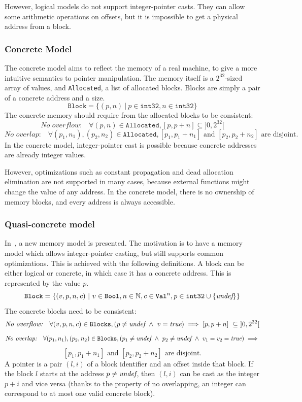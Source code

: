 However, logical models do not support integer-pointer casts. They can allow some arithmetic operations on offsets, but it is impossible to get a physical address from a block.

\subsubsection{Concrete Model}
The concrete model aims to reflect the memory of a real machine, to give a more intuitive semantics to pointer manipulation. 
The memory itself is a $2^{32}$-sized array of values, and \texttt{Allocated}, a list of allocated blocks.
Blocks are simply a pair of a concrete address and a size.
$$\texttt{Block}=\{(p,n)~|~p\in\texttt{int32},n\in\texttt{int32}\}$$
The concrete memory should require from the allocated blocks to be consistent:
$$\textit{No overflow:}\quad\forall (p,n)\in\texttt{Allocated}, [p,p+n]\subseteq]0,2^{32}[$$
$$\textit{No overlap:}\quad\forall (p_1,n_1), (p_2,n_2)\in\texttt{Allocated}, [p_1,p_1+n_1]\text{ and }[p_2,p_2+n_2]\text{ are disjoint.}$$
In the concrete model, integer-pointer cast is possible because concrete addresses are already integer values.

However, optimizations such as constant propagation and dead allocation elimination are not supported in many cases, because external functions might change the value of any address. In the concrete model, there is no ownership of memory blocks, and every address is always accessible.
\subsubsection{Quasi-concrete model}
In~\cite{DBLP:conf/pldi/KangHMGZV15}, a new memory model is presented. The motivation is to have a memory model which allows integer-pointer casting, but still supports common optimizations.
This is achieved with the following definitions.
A block can be either logical or concrete, in which case it has a concrete address. This is represented by the value $p$.
$$\texttt{Block}=\{(v,p,n,c)~|~v\in\texttt{Bool},n\in\mathbb{N},c\in\texttt{Val}^{n},p\in\texttt{int32}\cup\{\textit{undef}\}\}$$
The concrete blocks need to be consistent:
$$\textit{No overflow:}\quad\forall (v,p,n,c)\in\texttt{Blocks}, (p\neq\textit{undef}~\wedge~ v=\textit{true})\implies[p,p+n]~\subseteq~]0,2^{32}[$$
$$\textit{No overlap:}\quad\forall (p_1,n_1), (p_2,n_2)\in\texttt{Blocks}, (p_1\neq\textit{undef}~\wedge~p_2\neq\textit{undef} ~\wedge~ v_1=v_2=\textit{true})\implies$$ $$[p_1,p_1+n_1]\text{ and }[p_2,p_2+n_2]\text{ are disjoint.}$$
A pointer is a pair $(l,i)$ of a block identifier and an offset inside that block. If the block $l$ starts at the address $p\neq\textit{undef}$, then $(l,i)$ can be cast as the integer $p+i$ and vice versa (thanks to the property of no overlapping, an integer can correspond to at most one valid concrete block).

